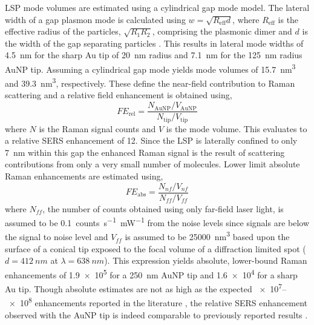 \documentclass{article}
\begin{document}
LSP mode volumes are estimated using a cylindrical gap mode model. The lateral width of a gap plasmon mode is calculated using $w=\sqrt{R_{\mathrm{eff}}d}$, where $R_{\mathrm{eff}}$ is the effective radius of the particles, $\sqrt{R_1R_2}$, comprising the plasmonic dimer and $d$ is the width of the gap separating particles \cite{romero2006}.
This results in lateral mode widths of \SI{4.5}{nm} for the sharp Au tip of \SI{20}{nm} radius and \SI{7.1}{nm} for the \SI{125}{nm} radius AuNP tip.
Assuming a cylindrical gap mode yields mode volumes of \SI{15.7}{nm\cubed} and \SI{39.3}{nm\cubed}, respectively. These define the near-field contribution to Raman scattering and a relative field enhancement is obtained using,
\begin{equation}
	\mathit{FE}_{\mathrm{rel}} = \frac{N_{\mathrm{AuNP}} / V_{\mathrm{AuNP}}}{N_{\mathrm{tip}} / V_{\mathrm{tip}}}
\end{equation}
where $N$ is the Raman signal counts and $V$ is the mode volume. This evaluates to a relative SERS enhancement of 12.
Since the LSP is laterally confined to only \SI{7}{nm} within this gap the enhanced Raman signal is the result of scattering contributions from only a very small number of molecules. Lower limit absolute Raman enhancements are estimated using,
\begin{equation}
	\mathit{FE}_{\mathrm{abs}} = \frac{N_{nf} / V_{nf}}{N_{ff} / V_{ff}}
\end{equation}
where $N_{ff}$, the number of counts obtained using only far-field laser light, is assumed to be \SI{0.1}{counts.s^{-1}.mW^{-1}} from the noise levels since signals are below the signal to noise level and $V_{ff}$ is assumed to be \SI{25000}{nm\cubed} based upon the surface of a conical tip exposed to the focal volume of a diffraction limited spot ($d = \SI{412}{nm}$ at $\lambda = \SI{638}{nm}$). %
This expression yields absolute, lower-bound Raman enhancements of \num{1.9e5} for a \SI{250}{nm} AuNP tip and \num{1.6e4} for a sharp Au tip. Though absolute estimates are not as high as the expected \num{e7}--\num{e8} enhancements reported in the literature \cite{pettinger2012}, the relative SERS enhancement observed with the AuNP tip is indeed comparable to previously reported results \cite{umakoshi2012}.
\end{document}
